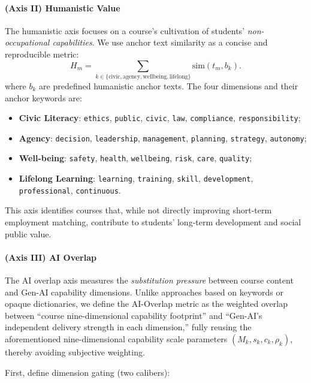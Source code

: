\paragraph{(Axis II) Humanistic Value}
The humanistic axis focuses on a course's cultivation of students' \emph{non-occupational capabilities}. We use anchor text similarity as a concise and reproducible metric:
\begin{equation}
    H_m=\sum_{k\in\{\mathrm{civic,agency,wellbeing,lifelong}\}} \mathrm{sim}(t_m, b_k).
\end{equation}
where $b_k$ are predefined humanistic anchor texts. The four dimensions and their anchor keywords are:
\begin{itemize}[nosep, leftmargin=1.5em]
    \item \textbf{Civic Literacy}: \texttt{ethics}, \texttt{public}, \texttt{civic}, \texttt{law}, \texttt{compliance}, \texttt{responsibility};
    \item \textbf{Agency}: \texttt{decision}, \texttt{leadership}, \texttt{management}, \texttt{planning}, \texttt{strategy}, \texttt{autonomy};
    \item \textbf{Well-being}: \texttt{safety}, \texttt{health}, \texttt{wellbeing}, \texttt{risk}, \texttt{care}, \texttt{quality};
    \item \textbf{Lifelong Learning}: \texttt{learning}, \texttt{training}, \texttt{skill}, \texttt{development}, \texttt{professional}, \texttt{continuous}.
\end{itemize}
This axis identifies courses that, while not directly improving short-term employment matching, contribute to students' long-term development and social public value.

\paragraph{(Axis III) AI Overlap}
The AI overlap axis measures the \emph{substitution pressure} between course content and Gen-AI capability dimensions. Unlike approaches based on keywords or opaque dictionaries, we define the AI-Overlap metric as the weighted overlap between ``course nine-dimensional capability footprint'' and ``Gen-AI's independent delivery strength in each dimension,'' fully reusing the aforementioned nine-dimensional capability scale parameters $(M_k,s_k,c_k,\rho_k)$, thereby avoiding subjective weighting.

First, define dimension gating (two calibers):

